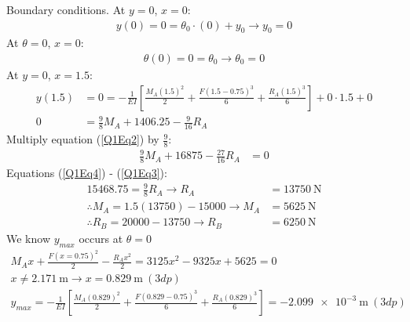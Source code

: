 \documentclass[11pt]{article}
\numberwithin{equation}{section}
\begin{document}
Boundary conditions. At $y= 0$, $x=0$:
\begin{align}
  y(0) = 0 = \theta_0 \cdot (0) + y_0 \rightarrow y_0 = 0
\end{align}
At $\theta = 0$, $x=0$:
\begin{align}
  \theta (0) = 0 = \theta_0 \rightarrow \theta_0 = 0  
\end{align}
At $y =0$, $x=1.5$:
\begin{align}
  y(1.5) &= 0 = -\frac{1}{EI} \left[ \frac{M_A(1.5)^2}{2} + \frac{F(1.5-0.75)^3}{6} + \frac{R_A (1.5)^3}{6} \right] + 0\cdot 1.5 + 0\\
  0 &= \frac{9}{8}M_A + 1406.25 - \frac{9}{16}R_A \label{Q1Eq3}
\end{align}
Multiply equation (\ref{Q1Eq2}) by $\frac{9}{8}$:
\begin{align}
  \frac{9}{8} M_A + 16875 - \frac{27}{16} R_A &= 0 \label{Q1Eq4}
\end{align}
Equations (\ref{Q1Eq4}) - (\ref{Q1Eq3}):
\begin{align}
  15468.75 = \frac{9}{8}R_A \rightarrow R_A &= \SI{13750}{\newton}\\
  \therefore M_A = 1.5(13750) - 15000 \rightarrow M_A &= \SI{5625}{\newton}\\
  \therefore R_B = 20000-13750 \rightarrow R_B &= \SI{6250}{\newton}
\end{align}
We know $y_{max}$ occurs at $\theta = 0$
\begin{gather}
  M_A x + \frac{F(x=0.75)^2}{2} - \frac{R_A x^2}{2} = 3125x^2 -9325x + 5625 = 0\\
  x\neq\SI{2.171}{\metre} \rightarrow x = \SI{0.829}{\metre} \ (3dp)\\
  y_{max} = -\frac{1}{EI} \left[ \frac{M_A(0.829)^2}{2} + \frac{F(0.829-0.75)^3}{6} + \frac{R_A (0.829)^3}{6} \right] = \SI{-2.099e-3}{\metre} \ (3dp)
\end{gather}
\end{document}
